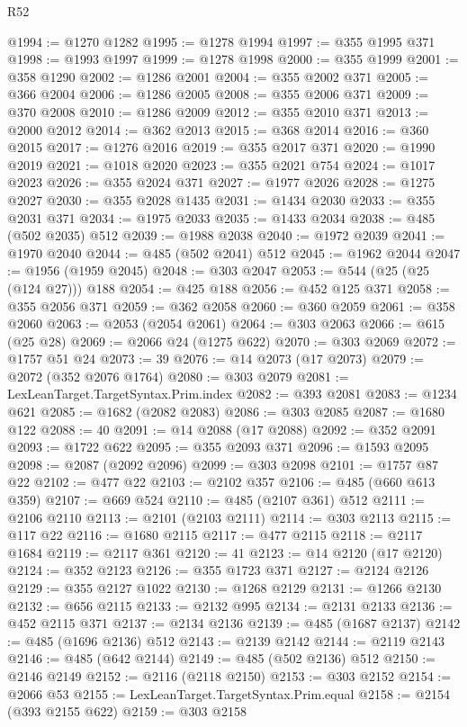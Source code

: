 \begin{lexlean}{R52}
\begin{coremodule}
@1994 := @1270 @1282
@1995 := @1278 @1994
@1997 := @355 @1995 @371
@1998 := @1993 @1997
@1999 := @1278 @1998
@2000 := @355 @1999
@2001 := @358 @1290
@2002 := @1286 @2001
@2004 := @355 @2002 @371
@2005 := @366 @2004
@2006 := @1286 @2005
@2008 := @355 @2006 @371
@2009 := @370 @2008
@2010 := @1286 @2009
@2012 := @355 @2010 @371
@2013 := @2000 @2012
@2014 := @362 @2013
@2015 := @368 @2014
@2016 := @360 @2015
@2017 := @1276 @2016
@2019 := @355 @2017 @371
@2020 := @1990 @2019
@2021 := @1018 @2020
@2023 := @355 @2021 @754
@2024 := @1017 @2023
@2026 := @355 @2024 @371
@2027 := @1977 @2026
@2028 := @1275 @2027
@2030 := @355 @2028 @1435
@2031 := @1434 @2030
@2033 := @355 @2031 @371
@2034 := @1975 @2033
@2035 := @1433 @2034
@2038 := @485 (@502 @2035) @512
@2039 := @1988 @2038
@2040 := @1972 @2039
@2041 := @1970 @2040
@2044 := @485 (@502 @2041) @512
@2045 := @1962 @2044
@2047 := @1956 (@1959 @2045)
@2048 := @303 @2047
@2053 := @544 (@25 (@25 (@124 @27))) @188
@2054 := @425 @188
@2056 := @452 @125 @371
@2058 := @355 @2056 @371
@2059 := @362 @2058
@2060 := @360 @2059
@2061 := @358 @2060
@2063 := @2053 (@2054 @2061)
@2064 := @303 @2063
@2066 := @615 (@25 @28)
@2069 := @2066 @24 (@1275 @622)
@2070 := @303 @2069
@2072 := @1757 @51 @24
@2073 := 39
@2076 := @14 @2073 (@17 @2073)
@2079 := @2072 (@352 @2076 @1764)
@2080 := @303 @2079
@2081 := LexLeanTarget.TargetSyntax.Prim.index
@2082 := @393 @2081
@2083 := @1234 @621
@2085 := @1682 (@2082 @2083)
@2086 := @303 @2085
@2087 := @1680 @122
@2088 := 40
@2091 := @14 @2088 (@17 @2088)
@2092 := @352 @2091
@2093 := @1722 @622
@2095 := @355 @2093 @371
@2096 := @1593 @2095
@2098 := @2087 (@2092 @2096)
@2099 := @303 @2098
@2101 := @1757 @87 @22
@2102 := @477 @22
@2103 := @2102 @357
@2106 := @485 (@660 @613 @359)
@2107 := @669 @524
@2110 := @485 (@2107 @361) @512
@2111 := @2106 @2110
@2113 := @2101 (@2103 @2111)
@2114 := @303 @2113
@2115 := @117 @22
@2116 := @1680 @2115
@2117 := @477 @2115
@2118 := @2117 @1684
@2119 := @2117 @361
@2120 := 41
@2123 := @14 @2120 (@17 @2120)
@2124 := @352 @2123
@2126 := @355 @1723 @371
@2127 := @2124 @2126
@2129 := @355 @2127 @1022
@2130 := @1268 @2129
@2131 := @1266 @2130
@2132 := @656 @2115
@2133 := @2132 @995
@2134 := @2131 @2133
@2136 := @452 @2115 @371
@2137 := @2134 @2136
@2139 := @485 (@1687 @2137)
@2142 := @485 (@1696 @2136) @512
@2143 := @2139 @2142
@2144 := @2119 @2143
@2146 := @485 (@642 @2144)
@2149 := @485 (@502 @2136) @512
@2150 := @2146 @2149
@2152 := @2116 (@2118 @2150)
@2153 := @303 @2152
@2154 := @2066 @53
@2155 := LexLeanTarget.TargetSyntax.Prim.equal
@2158 := @2154 (@393 @2155 @622)
@2159 := @303 @2158

\end{coremodule}
\end{lexlean}
